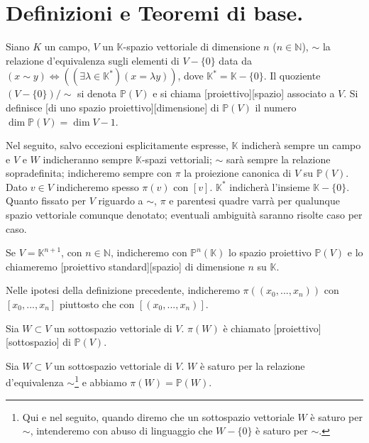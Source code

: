 \section{Definizioni e Teoremi di base.}

\begin{Definition}\label{def1}
	Siano $K$ un campo, $V$ un $\mathbb{K}$-spazio vettoriale di dimensione $n$ ($n \in \mathbb{N}$), $\sim$ la relazione d'equivalenza sugli elementi di $V - \lbrace 0 \rbrace$ data da $(x \sim y) \Leftrightarrow ((\exists \lambda \in \mathbb{K}^*)(x = \lambda y))$, dove $\mathbb{K}^* = \mathbb{K} - \lbrace 0 \rbrace$. Il quoziente $(V - \lbrace 0 \rbrace)/\sim$ si denota $\mathbb{P}(V)$ e si chiama [proiettivo][spazio] associato a $V$. Si definisce [di uno spazio proiettivo][dimensione] di $\mathbb{P}(V)$ il numero $\dim \mathbb{P}(V) = \dim V - 1$.
\end{Definition}
	\par Nel seguito, salvo eccezioni esplicitamente espresse, $\mathbb{K}$ indicher\`a sempre un campo e $V$ e $W$ indicheranno sempre $\mathbb{K}$-spazi vettoriali; $\sim$ sar\`a sempre la relazione sopradefinita; indicheremo sempre con $\pi$ la proiezione canonica di $V$ su $\mathbb{P}(V)$. Dato $v \in V$ indicheremo spesso $\pi(v)$ con $[v]$. $\mathbb{K}^*$ indicher\`a l'insieme $\mathbb{K} - \lbrace 0 \rbrace$. Quanto fissato per $V$ riguardo a $\sim$, $\pi$ e parentesi quadre varr\`a per qualunque spazio vettoriale comunque denotato; eventuali ambiguit\`a saranno risolte caso per caso.
\begin{Definition}\label{def2}
	Se $V = \mathbb{K}^{n + 1}$, con $n \in \mathbb{N}$, indicheremo con $\mathbb{P}^n(\mathbb{K})$ lo spazio proiettivo $\mathbb{P}(V)$ e lo chiameremo [proiettivo standard][spazio] di dimensione $n$ su $\mathbb{K}$.
\end{Definition}
	\par Nelle ipotesi della definizione precedente, indicheremo $\pi((x_0, ..., x_n))$ con $[x_0,...,x_n]$ piuttosto che con $[(x_0, ..., x_n)]$.
\begin{Definition}\label{def3}
	Sia $W \subset V$ un sottospazio vettoriale di $V$. $\pi(W)$ \`e chiamato [proiettivo][sottospazio] di $\mathbb{P}(V)$.
\end{Definition}
\begin{Theorem}\label{th1}
	Sia $W \subset V$ un sottospazio vettoriale di $V$. $W$ \`e saturo per la relazione d'equivalenza $\sim$\footnote{\label{nota_saturo} Qui e nel seguito, quando diremo che un sottospazio vettoriale $W$ \`e saturo per $\sim$, intenderemo con abuso di linguaggio che $W - \lbrace 0 \rbrace$ \`e saturo per $\sim$.} e abbiamo $\pi(W) = \mathbb{P}(W)$.
\end{Theorem}
